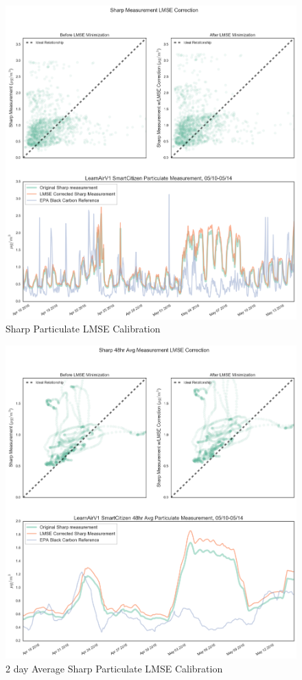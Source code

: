 \begin{figure}[htb]
 	\includegraphics[width=\textwidth]{figs/sharpDust_lmse}               
 	 \caption{Sharp Particulate LMSE Calibration}
  	\label{fig:sharpDust_lmse}
\end{figure}

\begin{figure}[htb]
 	\includegraphics[width=\textwidth]{figs/sharpDust_avg_48_lmse}               
 	 \caption{2 day Average Sharp Particulate LMSE Calibration}
  	\label{fig:sharpDust_avg_48_lmse}
\end{figure}







